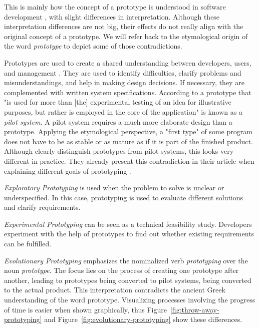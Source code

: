 This is mainly how the concept of a prototype is understood in software development \cite{budde_what_1992}, with slight differences in interpretation.
Although these interpretation differences are not big, their effects do not really align with the original concept of a prototype.
We will refer back to the etymological origin of the word \emph{prototype} to depict some of those contradictions.

Prototypes are used to create a shared understanding between developers, users, and management \cite{budde_what_1992}.
They are used to identify difficulties, clarify problems and misunderstandings, and help in making design decisions.
If necessary, they are complemented with written system specifications.
According to \cite{budde_what_1992} a prototype that "is used for more than [the] experimental testing of an idea for illustrative purposes, but rather is employed in the core of the application" is known as a \emph{pilot system}.
A pilot system requires a much more elaborate design than a prototype.
Applying the etymological perspective, a "first type" of some program does not have to be as stable or as mature as if it is part of the finished product.
Although \citeauthor{budde_what_1992} clearly distinguish prototypes from pilot systems, this looks very different in practice.
They already present this contradiction in their article when explaining different goals of prototyping \cite{budde_what_1992}.
\begin{enumerate*}[label=(\roman*)]
\item \emph{Exploratory Prototyping} is used when the problem to solve is unclear or underspecified. In this case, prototyping is used to evaluate different solutions and clarify requirements.
\item \emph{Experimental Prototyping} can be seen as a technical feasibility study. Developers experiment with the help of prototypes to find out whether existing requirements can be fulfilled.
\item \emph{Evolutionary Prototyping} emphasizes the nominalized verb \emph{prototyping} over the noun \emph{prototype}. The focus lies on the process of creating one prototype after another, leading to prototypes being converted to pilot systems, being converted to the actual product. This interpretation contradicts the ancient Greek understanding of the word prototype. Visualizing processes involving the progress of time is easier when shown graphically, thus Figure~\ref{fig:throw-away-prototyping} and Figure~\ref{fig:evolutionary-prototyping} show these differences.
\end{enumerate*}

